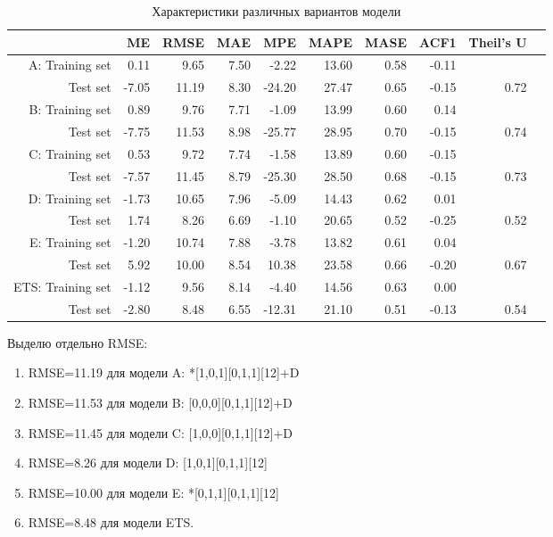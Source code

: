 \documentclass[14pt, a4paper]{extarticle}\usepackage[]{graphicx}\usepackage[]{color}
\begin{document}
\begin{table}[H]
\centering
\begin{tabular}{rrrrrrrrrr}
  \hline
 & ME & RMSE & MAE & MPE & MAPE & MASE & ACF1 & Theil's U \\ 
  \hline
A: Training set & 0.11 & 9.65 & 7.50 & -2.22 & 13.60 & 0.58 & -0.11 &  \\ 
   Test set & -7.05 & 11.19 & 8.30 & -24.20 & 27.47 & 0.65 & -0.15 & 0.72 \\ 
   \hline
   B: Training set & 0.89 & 9.76 & 7.71 & -1.09 & 13.99 & 0.60 & 0.14 &  \\ 
   Test set & -7.75 & 11.53 & 8.98 & -25.77 & 28.95 & 0.70 & -0.15 & 0.74 \\ 
   \hline
  C: Training set & 0.53 & 9.72 & 7.74 & -1.58 & 13.89 & 0.60 & -0.15 &  \\ 
   Test set & -7.57 & 11.45 & 8.79 & -25.30 & 28.50 & 0.68 & -0.15 & 0.73 \\ 
   \hline
  D: Training set & -1.73 & 10.65 & 7.96 & -5.09 & 14.43 & 0.62 & 0.01 &  \\ 
  Test set & 1.74 & 8.26 & 6.69 & -1.10 & 20.65 & 0.52 & -0.25 & 0.52 \\ 
   \hline
   E: Training set & -1.20 & 10.74 & 7.88 & -3.78 & 13.82 & 0.61 & 0.04 &  \\ 
   Test set & 5.92 & 10.00 & 8.54 & 10.38 & 23.58 & 0.66 & -0.20 & 0.67 \\ 
   \hline
   ETS: Training set & -1.12 & 9.56 & 8.14 & -4.40 & 14.56 & 0.63 & 0.00 &  \\ 
   Test set & -2.80 & 8.48 & 6.55 & -12.31 & 21.10 & 0.51 & -0.13 & 0.54 \\ 
   \hline
\end{tabular}
\caption{Характеристики различных вариантов модели} 
\end{table}

Выделю отдельно RMSE: 
\begin{enumerate}
\item RMSE=11.19 для модели A: *[1,0,1][0,1,1][12]+D
\item RMSE=11.53 для модели B: [0,0,0][0,1,1][12]+D
\item RMSE=11.45 для модели C: [1,0,0][0,1,1][12]+D
\item RMSE=8.26 для модели D: [1,0,1][0,1,1][12]
\item RMSE=10.00 для модели E: *[0,1,1][0,1,1][12]
\item RMSE=8.48 для модели ETS. 
\end{enumerate}
\end{document}

